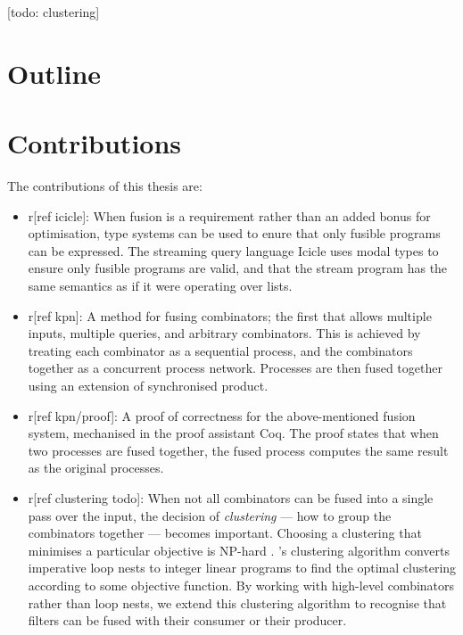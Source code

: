 [todo: clustering]

\section{Outline}
\section{Contributions}

The contributions of this thesis are:

\begin{itemize}
\item
r[ref icicle]:
When fusion is a requirement rather than an added bonus for optimisation, type systems can be used to enure that only fusible programs can be expressed.
The streaming query language Icicle uses modal types to ensure only fusible programs are valid, and that the stream program has the same semantics as if it were operating over lists.

\item
r[ref kpn]:
A method for fusing combinators; the first that allows multiple inputs, multiple queries, and arbitrary combinators.
This is achieved by treating each combinator as a sequential process, and the combinators together as a concurrent process network.
Processes are then fused together using an extension of synchronised product.

\item
r[ref kpn/proof]:
A proof of correctness for the above-mentioned fusion system, mechanised in the proof assistant Coq.
The proof states that when two processes are fused together, the fused process computes the same result as the original processes.

\item
r[ref clustering todo]:
When not all combinators can be fused into a single pass over the input, the decision of \emph{clustering} --- how to group the combinators together --- becomes important.
Choosing a clustering that minimises a particular objective is NP-hard .
's clustering algorithm converts imperative loop nests to integer linear programs to find the optimal clustering according to some objective function.
By working with high-level combinators rather than loop nests, we extend this clustering algorithm to recognise that filters can be fused with their consumer or their producer.
\end{itemize}



